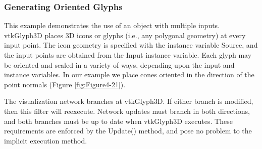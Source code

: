 \subsubsection{Generating Oriented Glyphs}
\label{subsubsec:generating_oriented_glyphs}

This example demonstrates the use of an object with multiple inputs. vtkGlyph3D places 3D icons or glyphs (i.e., any polygonal geometry) at every input point. The icon geometry is specified with the instance variable Source, and the input points are obtained from the Input instance variable. Each glyph may be oriented and scaled in a variety of ways, depending upon the input and instance variables. In our example we place cones oriented in the direction of the point normals (Figure \ref{fig:Figure4-21}).

The visualization network branches at vtkGlyph3D. If either branch is modified, then this filter will reexecute. Network updates must branch in both directions, and both branches must be up to date when vtkGlyph3D executes. These requirements are enforced by the Update() method, and pose no problem to the implicit execution method.

